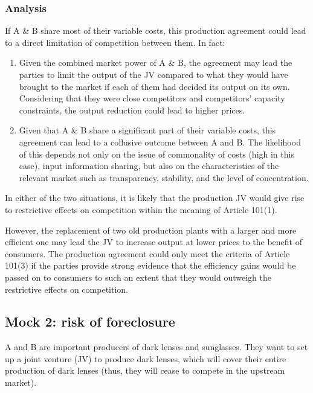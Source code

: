         \subsubsection{Analysis}

            If A \& B share most of their variable costs, this production agreement could lead to a direct limitation of competition between them. In fact:

            \begin{enumerate}[label=\alph*)]
                \item Given the combined market power of A \& B, the agreement may lead the parties to limit the output of the JV compared to what they would have brought to the market if each of them had decided its output on its own. Considering that they were close competitors and competitors’ capacity constraints, the output reduction could lead to higher prices.
                \item Given that A \& B share a significant part of their variable costs, this agreement can lead to a collusive outcome between A and B. The likelihood of this depends not only on the issue of commonality of costs (high in this case), input information sharing, but also on the characteristics of the relevant market such as transparency, stability, and the level of concentration.
            \end{enumerate}
            
            In either of the two situations, it is likely that the production JV would give rise to restrictive effects on competition within the meaning of Article 101(1).
            
            However, the replacement of two old production plants with a larger and more efficient one may lead the JV to increase output at lower prices to the benefit of consumers. The production agreement could only meet the criteria of Article 101(3) if the parties provide strong evidence that the efficiency gains would be passed on to consumers to such an extent that they would outweigh the restrictive effects on competition.

    \subsection{Mock 2: risk of foreclosure}

        A and B are important producers of dark lenses and sunglasses. They want to set up a joint venture (JV) to produce dark lenses, which will cover their entire production of dark lenses (thus, they will cease to compete in the upstream market).

